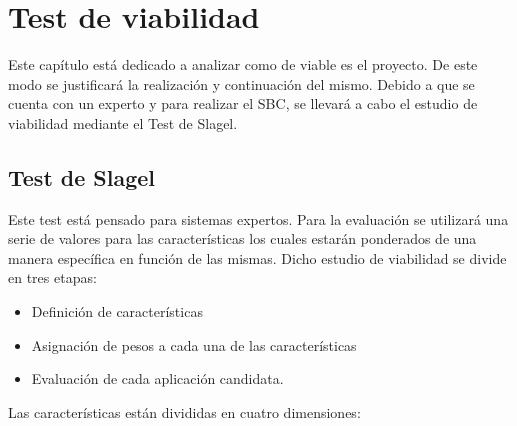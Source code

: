\chapter{Test de viabilidad}
\label{cap: Introducción y objetivos}

Este capítulo está dedicado a analizar como de viable es el proyecto. De este modo
se justificará la realización y continuación del mismo. Debido a que se cuenta con
un experto y para realizar el \acs{SBC}, se llevará a cabo
el estudio de viabilidad mediante el Test de Slagel.

\section{Test de Slagel}


Este test está pensado para sistemas expertos. Para la evaluación se utilizará una serie
de valores para las características los cuales estarán ponderados de una manera
específica en función de las mismas. Dicho estudio de viabilidad se divide en tres etapas:

\begin{itemize}
  \item Definición de características
  \item Asignación de pesos a cada una de las características
  \item Evaluación de cada aplicación candidata.
\end{itemize}

Las características están divididas en cuatro dimensiones:

